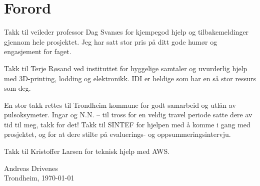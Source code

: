 \chapter*{Forord}
Takk til veileder professor Dag Svanæs for kjempegod hjelp og tilbakemeldinger gjennom hele prosjektet.
Jeg har satt stor pris på ditt gode humør og engasjement for faget.

Takk til Terje Røsand ved instituttet for hyggelige samtaler og uvurderlig hjelp med 3D-printing, lodding og elektronikk.
IDI er heldige som har en så stor ressurs som deg.

En stor takk rettes til Trondheim kommune for godt samarbeid og utlån av pulsoksymeter.
Ingar og N.N. -- til tross for en veldig travel periode satte dere av tid til meg, takk for det!
Takk til SINTEF for hjelpen med å komme i gang med prosjektet, og for at dere
stilte på evaluerings- og oppsummeringsintervju.

Takk til Kristoffer Larsen for teknisk hjelp med AWS.

\begin{flushright}
Andreas Drivenes\\[0.8pc]
Trondheim, \today
\end{flushright}
